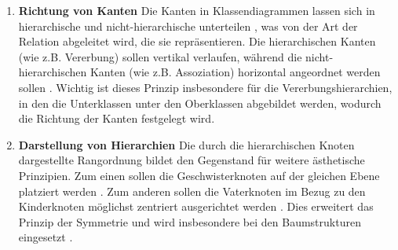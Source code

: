 \begin{enumerate}[label={\aestheticscriterialabel.\arabic*}, resume]

\item
\label{pri:edge-direction}
\textbf{Richtung von Kanten}
Die Kanten in Klassendiagrammen lassen sich in hierarchische und nicht-hierarchische unterteilen \cite{Eichelberger05Aesthetics}, was von der Art der Relation abgeleitet wird, die sie repräsentieren. Die hierarchischen Kanten (wie z.B. Vererbung) sollen vertikal verlaufen, während die nicht-hierarchischen Kanten (wie z.B. Assoziation) horizontal angeordnet werden sollen \cite{EichelbergerSchmid09Guidelines, Ambler05The-Elements}. Wichtig ist dieses Prinzip insbesondere für die Vererbungshierarchien, in den die Unterklassen unter den Oberklassen abgebildet werden, wodurch die Richtung der Kanten festgelegt wird.

\item
\label{pri:hierarchies}
\textbf{Darstellung von Hierarchien}
Die durch die hierarchischen Knoten dargestellte Rangordnung bildet den Gegenstand für weitere ästhetische Prinzipien. Zum einen sollen die Geschwisterknoten auf der gleichen Ebene platziert werden \cite{Siebenhaller03Automatisches}. Zum anderen sollen die Vaterknoten im Bezug zu den Kinderknoten möglichst zentriert ausgerichtet werden \cite{EichelbergerSchmid09Guidelines, Siebenhaller03Automatisches}. Dies erweitert das Prinzip der Symmetrie \cite{EichelbergerSchmid09Guidelines} und wird insbesondere bei den Baumstrukturen eingesetzt \cite{Siebenhaller03Automatisches}.

\vspace{0.5cm}


\end{enumerate}
